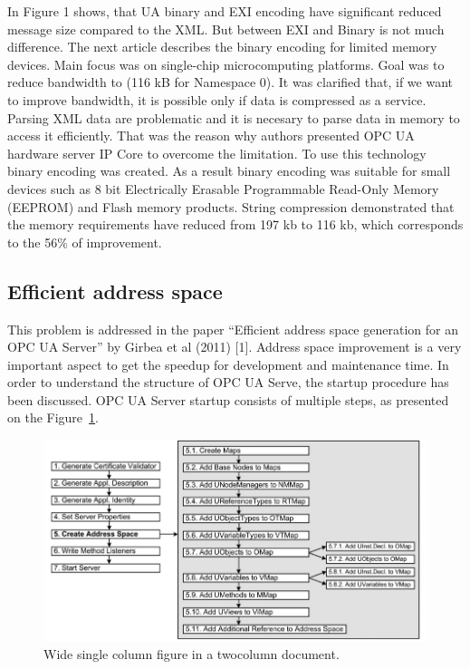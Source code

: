 \documentclass[conference]{IEEEtran}
\begin{document}
In Figure 1 shows, that UA binary and EXI encoding have significant reduced message size compared to the XML. But between EXI and Binary is not much difference. The next article \cite{efficient2016binaryencoding} describes the binary encoding for limited memory devices. Main focus was on single-chip microcomputing platforms. Goal was to reduce bandwidth to (116 kB for Namespace 0). It was clarified that, if we want to improve bandwidth, it is possible only if data is compressed as a service\cite{efficient2016binaryencoding}. Parsing XML data are problematic and it is necesary to parse data in memory to access it efficiently. That was the reason why authors presented  OPC UA hardware server IP Core to overcome the limitation. To use this technology binary encoding was created. As a result binary encoding was suitable for small devices such as 8 bit Electrically Erasable Programmable Read-Only Memory (EEPROM) and Flash memory products. String compression demonstrated that the memory requirements have reduced from 197 kb to 116 kb, which corresponds to the 56\% of improvement\cite{efficient2016binaryencoding}.



\subsection{Efficient address space}
This problem is addressed in the paper “Efficient address space generation for an OPC UA Server” by Girbea et al (2011) [1]. Address space improvement is a very important aspect to get the speedup for development and maintenance time. In order to understand the structure of OPC UA Serve, the startup procedure has been discussed. OPC UA Server startup consists of multiple steps, as presented on the Figure~\ref{f:Steps}. 

\begin{figure}[ht]
\centering
\includegraphics[width=1\linewidth]{Figures/Steps}\quad
\caption{\label{f:Steps}Wide single column figure in a twocolumn document.}
\end{figure}
\end{document}
